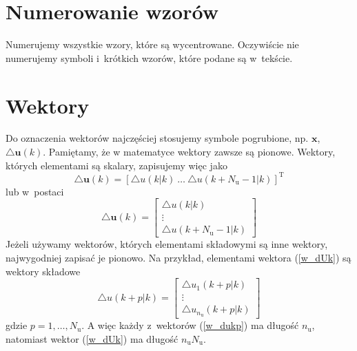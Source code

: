 \section{Numerowanie wzorów}
Numerujemy wszystkie wzory, które są wycentrowane. Oczywiście nie numerujemy symboli i~krótkich wzorów, które podane są w~tekście.

\section{Wektory}
Do oznaczenia wektorów najczęściej stosujemy symbole pogrubione, np. $\boldsymbol{x}$, $\triangle\boldsymbol{u}(k)$. Pamiętamy, że w matematyce wektory zawsze są pionowe. Wektory, których elementami są skalary, zapisujemy więc jako
\begin{equation}
\triangle\boldsymbol{u}(k)=\left[\triangle u(k|k) \ \ldots \ \triangle u(k+N_{\text{u}}-1|k) \right]^{\text{T}}
\end{equation}
lub w~postaci
\begin{equation}
\triangle\boldsymbol{u}(k)=\left[
\begin{array}{c}
\triangle u(k|k)\\
\vdots\\
\triangle u(k+N_{\text{u}}-1|k)
\end{array}
\right]
\label{w_dUk}
\end{equation}
Jeżeli używamy wektorów, których elementami składowymi są inne wektory, najwygodniej zapisać je pionowo. Na przykład, elementami wektora (\ref{w_dUk}) są wektory składowe
\begin{equation}
\triangle u(k+p|k)=\left[
\begin{array}{c}
\triangle u_1(k+p|k)\\
\vdots\\
\triangle u_{n_{\text{u}}}(k+p|k)
\end{array}
\right]
\label{w_dukp}
\end{equation}
gdzie $p=1,\ldots,N_{\text{u}}$. A więc każdy z~wektorów (\ref{w_dukp}) ma długość $n_{\text{u}}$, natomiast wektor (\ref{w_dUk}) ma długość $n_{\text{u}}N_{\text{u}}$.

